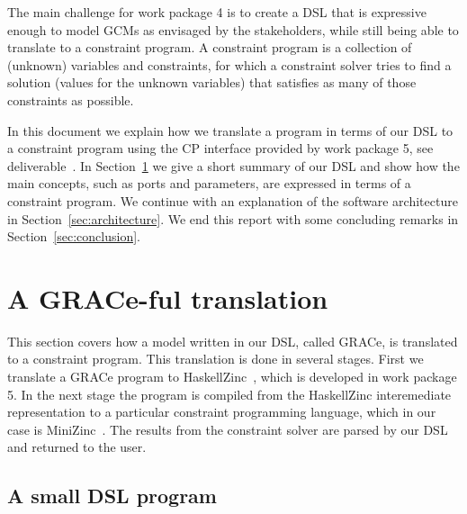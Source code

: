 \documentclass{article}
\begin{document}
The main challenge for work package 4 is to create a \ac{DSL} that is expressive
enough to model \acp{GCM} as envisaged by the stakeholders, while still being
able to translate to a constraint program. A constraint program is a
collection of (unknown) variables and constraints, for which a constraint solver
tries to find a solution (values for the unknown variables) that satisfies as
many of those constraints as possible. 

In this document we explain how we translate a program in terms of our \ac{DSL} 
to a constraint program using the \ac{CP} interface provided by work package 5, 
see deliverable~\cite{}. In Section~\ref{sec:translate} we give a short summary
of our \ac{DSL} and show how the main concepts, such as ports and parameters,
are expressed in terms of a constraint program. We continue with an explanation
of the software architecture in Section~\ref{sec:architecture}. We end this 
report with some concluding remarks in Section~\ref{sec:conclusion}.


\section{A GRACe-ful translation}
\label{sec:translate}


This section covers how a model written in our DSL, called GRACe, is translated
to a constraint program. This translation is done in several stages. First we
translate a GRACe program to HaskellZinc~\cite{}, which is developed in work
package 5. In the next stage the program is compiled from the HaskellZinc
interemediate representation to a particular constraint programming language,
which in our case is MiniZinc~\cite{MiniZinc}. The results from the constraint
solver are parsed by our \ac{DSL} and returned to the user. 

\subsection{A small DSL program}
\end{document}

